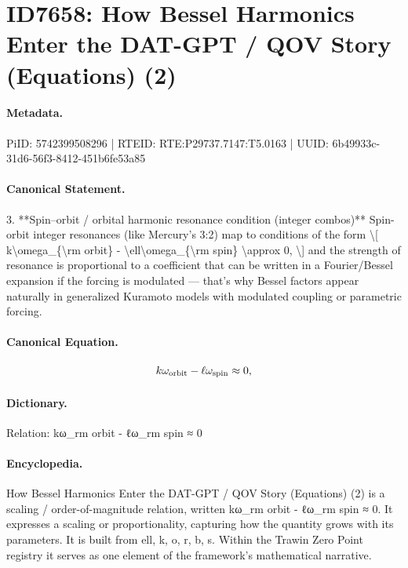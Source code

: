 \section*{ID7658: How Bessel Harmonics Enter the DAT-GPT / QOV Story (Equations) (2)}
\paragraph{Metadata.}
PiID: 5742399508296 | RTEID: RTE:P29737.7147:T5.0163 | UUID: 6b49933c-31d6-56f3-8412-451b6fe53a85

\paragraph{Canonical Statement.}
3. **Spin–orbit / orbital harmonic resonance condition (integer combos)** Spin-orbit integer resonances (like Mercury’s 3:2) map to conditions of the form \textbackslash{}[ k\textbackslash{}omega\_\{\textbackslash{}rm orbit\} - \textbackslash{}ell\textbackslash{}omega\_\{\textbackslash{}rm spin\} \textbackslash{}approx 0, \textbackslash{}] and the strength of resonance is proportional to a coefficient that can be written in a Fourier/Bessel expansion if the forcing is modulated — that’s why Bessel factors appear naturally in generalized Kuramoto models with modulated coupling or parametric forcing.

\paragraph{Canonical Equation.}
\[
k\omega_{\rm orbit} - \ell\omega_{\rm spin} \approx 0,
\]

\paragraph{Dictionary.}
Relation: kω\_rm orbit - ℓω\_rm spin ≈ 0

\paragraph{Encyclopedia.}
How Bessel Harmonics Enter the DAT-GPT / QOV Story (Equations) (2) is a scaling / order-of-magnitude relation, written kω\_rm orbit - ℓω\_rm spin ≈ 0. It expresses a scaling or proportionality, capturing how the quantity grows with its parameters. It is built from ell, k, o, r, b, s. Within the Trawin Zero Point registry it serves as one element of the framework's mathematical narrative.
